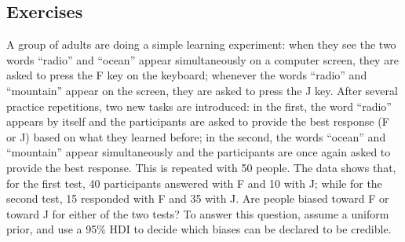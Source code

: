 \subsection*{Exercises}
\begin{Exercise}
\label{ex4.2.1}
A group of adults are doing a simple learning experiment: when they see the two words ``radio'' and ``ocean'' appear simultaneously on a computer screen, they are asked to press the F key on the keyboard; whenever the words ``radio'' and ``mountain'' appear on the screen, they are asked to press the J key.  After several practice repetitions, two new tasks are introduced: in the first, the word ``radio'' appears by itself and the participants are asked to provide the best response (F or J) based on what they learned before; in the second, the words ``ocean'' and ``mountain'' appear simultaneously and the participants are once again asked to provide the best response. This is repeated with 50 people. The data shows that, for the first test, 40 participants answered with F and 10 with J; while for the second test, 15 responded with F and 35 with J. Are people biased toward F or toward J for either of the two tests? To answer this question, assume a uniform prior, and use a 95\% HDI to decide which biases can be declared to be credible.
\end{Exercise}


